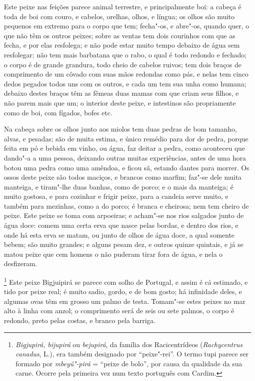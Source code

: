  Este peixe nas feições parece animal terrestre, e principalmente boi: a
cabeça é toda de boi com couro, e cabelos, orelhas, olhos, e língua; os
olhos são muito pequenos em extremo para o corpo que tem; fecha"-os, e
abre"-os, quando quer, o que não têm os outros peixes; sobre as ventas
tem dois courinhos com que as fecha, e por elas resfolega; e não pode
estar muito tempo debaixo de água sem resfolegar; não tem mais
barbatana que o rabo, o qual é todo redondo e fechado; o corpo é de
grande grandura, todo cheio de cabelos ruivos; tem dois braços de
comprimento de um côvado com suas mãos redondas como pás, e nelas tem
cinco dedos pegados todos uns com os outros, e cada um tem sua unha
como humana; debaixo destes braços têm as fêmeas duas mamas com que
criam seus filhos, e não parem mais que um; o interior deste peixe, e
intestinos são propriamente como de boi, com fígados, bofes etc.

 Na cabeça sobre os olhos junto aos miolos tem duas pedras de bom
tamanho, alvas, e pesadas; são de muita estima, e único remédio para
dor de pedra, porque feita em pó e bebida em vinho, ou água, faz deitar
a pedra, como aconteceu que dando"-a a uma pessoa, deixando outras
muitas experiências, antes de uma hora botou uma pedra como uma
amêndoa, e ficou sã, estando dantes para morrer. Os ossos deste peixe
são todos maciços, e brancos como marfim; faz"-se dele muita manteiga,
e tiram"-lhe duas banhas, como de porco; e o mais da manteiga; é muito
gostosa, e para cozinhar e frigir peixe, para a candeia serve muito, e
também para mezinhas, como a do porco; é branca e cheirosa; nem tem
cheiro de peixe. Este peixe se toma com arpoeiras; e acham"-se nos rios
salgados junto de água doce: comem uma certa erva que nasce pelas
bordas, e dentro dos rios, e onde há esta erva se matam, ou junto de
olhos de água doce, a qual somente bebem; são muito grandes; e alguns
pesam dez, e outros quinze quintais, e já se matou peixe que cem
homens o não puderam tirar fora de água, e nela o desfizeram.

\footnote{ \textit{Bigjupirá, bijupirá} ou
\textit{bejupirá}, da família dos Racicentrídeos (\textit{Rachycentrus
canadus}, L.), era também designado por ``peixe"-rei''. O termo tupi
parece ser formado por \textit{mbeyú"-pirá} = ``peixe de bolo'', por causa
da qualidade da sua carne. Ocorre pela primeira vez num texto português
com Cardim.} Este peixe Bigjuipirá se parece com solho de
Portugal, e assim é cá estimado, e tido por peixe real; é muito sadio,
gordo, e de bom gosto; há infinidade deles, e algumas ovas têm em
grosso um palmo de testa. Tomam"-se estes peixes no mar alto à linha
com anzol; o comprimento será de seis ou sete palmos, o corpo é
redondo, preto pelas costas, e branco pela barriga.

